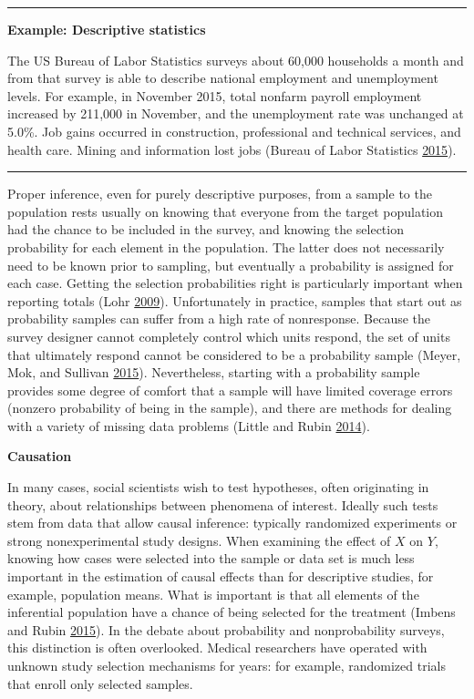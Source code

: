 \documentclass[]{krantz}
\begin{document}
\begin{center}\rule{0.5\linewidth}{\linethickness}\end{center}

\textbf{Example: Descriptive statistics}

The US Bureau of Labor Statistics surveys about 60,000 households a
month and from that survey is able to describe national employment and
unemployment levels. For example, in November 2015, total nonfarm
payroll employment increased by 211,000 in November, and the
unemployment rate was unchanged at 5.0\%. Job gains occurred in
construction, professional and technical services, and health care.
Mining and information lost jobs (Bureau of Labor Statistics
\protect\hyperlink{ref-BLS2015}{2015}).

\begin{center}\rule{0.5\linewidth}{\linethickness}\end{center}

Proper inference, even for purely descriptive purposes, from a sample to
the population rests usually on knowing that everyone from the target
population had the chance to be included in the survey, and knowing the
selection probability for each element in the population. The latter
does not necessarily need to be known prior to sampling, but eventually
a probability is assigned for each case. Getting the selection
probabilities right is particularly important when reporting totals
(Lohr \protect\hyperlink{ref-lohr2009sampling}{2009}). Unfortunately in
practice, samples that start out as probability samples can suffer from
a high rate of nonresponse. Because the survey designer cannot
completely control which units respond, the set of units that ultimately
respond cannot be considered to be a probability sample (Meyer, Mok, and
Sullivan \protect\hyperlink{ref-Meyer2015}{2015}). Nevertheless,
starting with a probability sample provides some degree of comfort that
a sample will have limited coverage errors (nonzero probability of being
in the sample), and there are methods for dealing with a variety of
missing data problems (Little and Rubin
\protect\hyperlink{ref-little2014statistical}{2014}).

\textbf{Causation}

In many cases, social scientists wish to test hypotheses, often
originating in theory, about relationships between phenomena of
interest. Ideally such tests stem from data that allow causal inference:
typically randomized experiments or strong nonexperimental study
designs. When examining the effect of \(X\) on \(Y\), knowing how cases
were selected into the sample or data set is much less important in the
estimation of causal effects than for descriptive studies, for example,
population means. What is important is that all elements of the
inferential population have a chance of being selected for the treatment
(Imbens and Rubin \protect\hyperlink{ref-imbens2015causal}{2015}). In
the debate about probability and nonprobability surveys, this
distinction is often overlooked. Medical researchers have operated with
unknown study selection mechanisms for years: for example, randomized
trials that enroll only selected samples.
\end{document}

